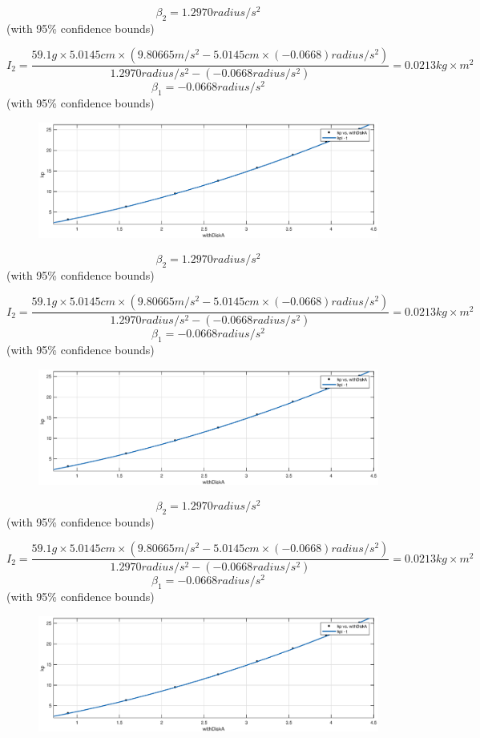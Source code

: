 $$ \beta_2 = 1.2970 radius/s^2$$ (with 95\% confidence bounds) 

$$ I_2 = \frac{59.1 g \times 5.0145 cm \times (9.80665 m/s^2 - 5.0145 cm \times (-0.0668) radius/s^2 )}{1.2970 radius/s^2 -(-0.0668 radius/s^2) } = 0.0213 kg\times m^2 $$$$ \beta_1 = -0.0668 radius/s^2$$ (with 95\% confidence bounds) 

\begin{figure}[H]
\centering
\includegraphics[width=\EFWwr]{matlab/wda}
\end{figure}

$$ \beta_2 = 1.2970 radius/s^2$$ (with 95\% confidence bounds) 

$$ I_2 = \frac{59.1 g \times 5.0145 cm \times (9.80665 m/s^2 - 5.0145 cm \times (-0.0668) radius/s^2 )}{1.2970 radius/s^2 -(-0.0668 radius/s^2) } = 0.0213 kg\times m^2 $$$$ \beta_1 = -0.0668 radius/s^2$$ (with 95\% confidence bounds) 

\begin{figure}[H]
\centering
\includegraphics[width=\EFWwr]{matlab/wda}
\end{figure}

$$ \beta_2 = 1.2970 radius/s^2$$ (with 95\% confidence bounds) 

$$ I_2 = \frac{59.1 g \times 5.0145 cm \times (9.80665 m/s^2 - 5.0145 cm \times (-0.0668) radius/s^2 )}{1.2970 radius/s^2 -(-0.0668 radius/s^2) } = 0.0213 kg\times m^2 $$$$ \beta_1 = -0.0668 radius/s^2$$ (with 95\% confidence bounds) 

\begin{figure}[H]
\centering
\includegraphics[width=\EFWwr]{matlab/wda}
\end{figure}

